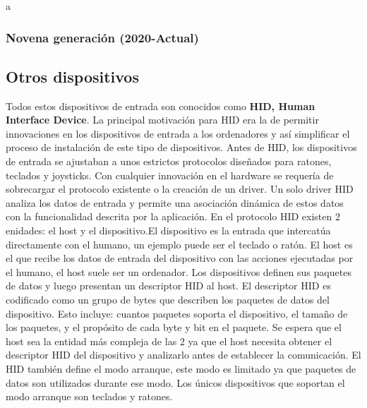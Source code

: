 a

\subsubsection{Novena generaci\'on (2020-Actual)}
\subsection{Otros dispositivos}

Todos estos dispositivos de entrada son conocidos como \textbf{HID, Human Interface Device}. La principal motivaci\'on para HID era la de permitir innovaciones en los dispositivos de entrada a los ordenadores y as\'i simplificar el proceso de instalaci\'on de este tipo de dispositivos. Antes de HID, los dispositivos de entrada se ajustaban a unos estrictos protocolos dise\~nados para ratones, teclados y joysticks. Con cualquier innovaci\'on en el hardware se requer\'ia de sobrecargar el protocolo existente o la creaci\'on de un driver. Un solo driver HID analiza los datos de entrada y permite una asociaci\'on din\'amica de estos datos con la funcionalidad descrita por la aplicaci\'on. En el protocolo HID existen 2 enidades: el host y el dispositivo.El dispositivo es la entrada que intercat\'ua directamente con el humano, un ejemplo puede ser el teclado o rat\'on. El host es el que recibe los datos de entrada del dispositivo con las acciones ejecutadas por el humano, el host suele ser un ordenador.
 Los dispositivos definen sus paquetes de datos y luego presentan un descriptor HID al host. El descriptor HID es codificado como un grupo de bytes que describen los paquetes de datos del dispositivo. Esto incluye: cuantos paquetes soporta el dispositivo, el tama\~no de los paquetes, y el prop\'osito de cada byte y bit en el paquete. Se espera que el host sea la entidad m\'as compleja de las 2 ya que el host necesita obtener el descriptor HID del dispositivo y analizarlo antes de establecer la comunicaci\'on. El HID tambi\'en define el modo arranque, este modo es limitado ya que paquetes de datos son utilizados durante ese modo. Los \'unicos dispositivos que soportan el modo arranque son teclados y ratones.\\


